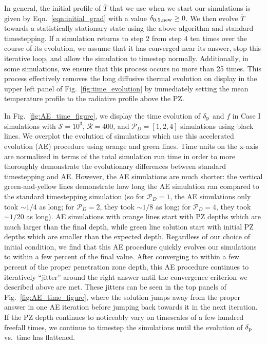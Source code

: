 \documentclass[twocolumn]{aastex631}
\newcommand{\delp}{\ensuremath{\delta_{\rm{p}}}}
\newcommand{\mP}{\ensuremath{\mathcal{P}}}
\newcommand{\mR}{\ensuremath{\mathcal{R}}}
\newcommand{\mS}{\ensuremath{\mathcal{S}}}
\renewcommand{\bar}[1]{\overline{#1}}
\begin{document}
In general, the initial profile of $\bar{T}$ that we use when we start our simulations is given by Eqn.~\ref{eqn:initial_grad} with a value $\delta_{0.5,\rm{new}} \geq 0$.
We then evolve $\bar{T}$ towards a statistically stationary state using the above algorithm and standard timestepping.
If a simulation returns to step 2 from step 4 ten times over the course of its evolution, we assume that it has converged near its answer, stop this iterative loop, and allow the simulation to timestep normally.
Additionally, in some simulations, we ensure that this process occurs no more than 25 times.
This process effectively removes the long diffusive thermal evolution on display in the upper left panel of Fig.~\ref{fig:time_evolution} by immediately setting the mean temperature profile to the radiative profile above the PZ.

In Fig.~\ref{fig:AE_time_figure}, we display the time evolution of $\delp$ and $f$ in Case I simulations with $\mS = 10^3$, $\mR = 400$, and $\mP_D = [1,2,4]$ simulations using black lines.
We overplot the evolution of simulations which use this accelerated evolution (AE) procedure using orange and green lines.
Time units on the x-axis are normalized in terms of the total simulation run time in order to more thoroughly demonstrate the evolutionary differences between standard timestepping and AE.
However, the AE simulations are much shorter: the vertical green-and-yellow lines demonstrate how long the AE simulation ran compared to the standard timestepping simulation (so for $\mP_D = 1$, the AE simulations only took $\sim 1/4$ as long; for $\mP_D = 2$, they took $\sim 1/8$ as long; for $\mP_D = 4$, they took $\sim 1/20$ as long).
AE simulations with orange lines start with PZ depths which are much larger than the final depth, while green line solution start with initial PZ depths which are smaller than the expected depth.
Regardless of our choice of initial condition, we find that this AE procedure quickly evolves our simulations to within a few percent of the final value.
After converging to within a few percent of the proper penetration zone depth, this AE procedure continues to iteratively ``jitter'' around the right answer until the convergence criterion we described above are met.
These jitters can be seen in the top panels of Fig.~\ref{fig:AE_time_figure}, where the solution jumps away from the proper answer in one AE iteration before jumping back towards it in the next iteration.
If the PZ depth continues to noticeably vary on timescales of a few hundred freefall times, we continue to timestep the simulations until the evolution of $\delp$ vs.~time has flattened.
\end{document}
